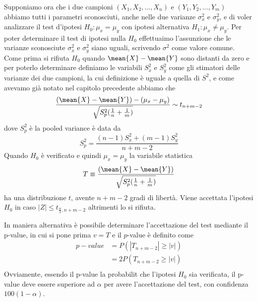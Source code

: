 Supponiamo ora che i due campioni $(X_1, X_2, \dots, X_n)$ e $(Y_1, Y_2, \dots, Y_m)$ abbiamo tutti i parametri
sconosciuti, anche nelle due varianze $\sigma_x^2$ e $\sigma_y^2$, e di voler analizzare il test d'ipotesi 
$H_0:\mu_x = \mu_y$ con ipotesi alternativa $H_1:\mu_x \neq \mu_y$.\newline
Per poter determinare il test di ipotesi nulla $H_0$ effettuaimo l'assunzione che le varianze sconosciute $\sigma_x^2$ 
e $\sigma_y^2$ siano uguali, scrivendo $\sigma^2$ come valore comune.\newline
Come prima si rifiuta $H_0$ quando $\mean{X} - \mean{Y}$ sono distanti da zero e per poterlo determinare definiamo 
le variabili $S_x^2$ e $S_y^2$ come gli stimatori delle varianze dei due campioni, la cui definizione è uguale a quella
di $S^2$, e come avevamo già notato nel capitolo precedente abbiamo che
\[ \frac{(\mean{X} - \mean{Y}) - (\mu_x - \mu_y)}{\sqrt{S^2_p(\frac{1}{n} + \frac{1}{m})}} \sim t_{n + m - 2} \]
dove $S_p^2$ è la pooled variance è data da 
\[ S_p^2 = \frac{(n-1)S^2_x + (m - 1)S^2_y}{n + m - 2} \]
Quando $H_0$ è verificato e quindi $\mu_x = \mu_y$ la variabile statistica 
\[ T \equiv \frac{(\mean{X} - \mean{Y})}{\sqrt{S^2_p(\frac{1}{n} + \frac{1}{m})}} \]
ha una distribuzione $t$, avente $n + m - 2$ gradi di libertà.\newline
Viene accettata l'ipotesi $H_0$ in caso $|Z| \leq t_{\frac{\alpha}{2}, n + m - 2}$ altrimenti lo si rifiuta.

In maniera alternativa è possibile determinare l'accettazione del test mediante il p-value, in cui si pone prima $v = T$
e il $p$-value è definito come
\[ \begin{split} 
    p-value & = P(|T_{n + m -2}| \geq |v|) \\
            & = 2P(T_{n + m -2} \geq |v|)\\
   \end{split} \]
Ovviamente, essendo il p-value la probabilit che l'ipotesi $H_0$ sia verificata, il p-value deve essere superiore ad
$\alpha$ per avere l'accettazione del test, con confidenza $100(1 - \alpha)$.

